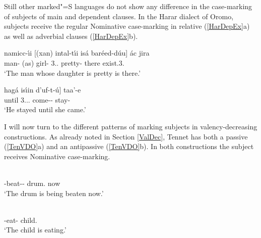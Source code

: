 Still other marked"=S languages do not show any difference in the case-marking of subjects of main and dependent clauses.
In the Harar dialect of Oromo, subjects receive the regular Nominative  case-marking in relative (\ref{HarDepEx}a) as well as adverbial clauses (\ref{HarDepEx}b).

\pagebreak
\begin{exe} \ex\label{HarDepEx}
\begin{xlist}
\ex\gll namicc-\'\i i  {\rm[}(xan) intal-t\'\i i is\'a bar\'eed-d\'uu{\rm]} \'ac jira\\
man-\nom{} (as) girl-\nom{} 3\sg{}.\mas{}.\acc{} pretty-\fem{} there exist.3\sg{}.\mas{}\\
\glt `The man whose daughter is pretty is there.'

\ex\gll  {\rm[}hag\'a is\'\i in d'uf-t-\'u{\rm]} taa'-e\\
until 3.\sg{}.\fem{}.\nom{} come-\fem{}-\dep{} stay-\pst{}\\
\glt `He stayed until she came.'
\end{xlist}
\end{exe} 

I will now turn to the different patterns of marking subjects in valency-de\-crea\-sing constructions.  
As already noted in Section \ref{ValDec},  
Tennet has both a passive (\ref{TenVDO}a) and an antipassive (\ref{TenVDO}b). 
In both constructions the subject receives Nominative  case-marking. 

\begin{exe}\ex\label{TenVDO}
\begin{xlist}
\ex\gll{}  \\
\ipfv{}-beat-\epen{}-\pass{} drum.\nom{} now\\
\glt `The drum is being beaten now.' 

\ex\gll{} \\
\ipfv{}-eat-\antip{} child.\nom{}\\
\glt `The child is eating.' 
\end{xlist}
\end{exe}


